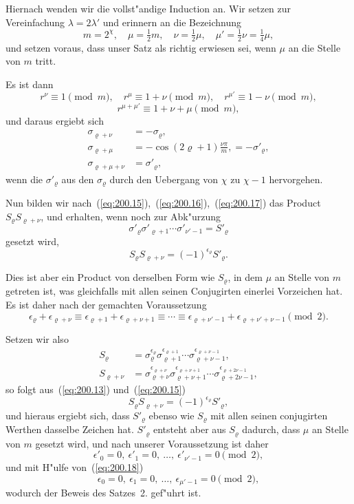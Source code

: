 \documentclass[10pt,a4paper]{article}
\theoremstyle{weberstyle}
\begin{document}
Hiernach wenden wir die vollst"andige Induction an. Wir setzen zur
Vereinfachung $\lambda=2\lambda'$ und erinnern an die Bezeichnung
\begin{equation}\label{eq:200.14}
m=2^\chi,\quad \mu=\tfrac{1}{2}m,\quad \nu=\tfrac{1}{2}\mu,\quad
\mu'=\tfrac{1}{2}\nu=\tfrac{1}{4}\mu,
\end{equation}
und setzen voraus, dass unser Satz als richtig erwiesen sei, wenn $\mu$ an
die Stelle von $m$ tritt.

Es ist dann
\[
r^{\nu}\equiv 1\pmod{m},\quad r^{\mu}\equiv 1+\nu\pmod{m},\quad
r^{\mu'}\equiv 1-\nu\pmod{m},
\]
\[
r^{\mu+\mu'}\equiv 1+\nu+\mu\pmod{m},
\]
und daraus ergiebt sich
\begin{align}
\sigma_{\varrho+\nu} &= -\sigma_\varrho,\label{eq:200.15}\\
\sigma_{\varrho+\mu} &= -\cos(2\varrho+1)\frac{\nu\pi}{m},
= -\sigma'_\varrho,\label{eq:200.16}\\
\sigma_{\varrho+\mu+\nu} &= \sigma'_\varrho,\label{eq:200.17}
\end{align}
wenn die $\sigma'_\varrho$ aus den $\sigma_\varrho$ durch den Uebergang von $\chi$
zu $\chi-1$ hervorgehen.

Nun bilden wir nach~(\ref{eq:200.15}),~(\ref{eq:200.16}),~(\ref{eq:200.17})
das Product $S_\varrho S_{\varrho+\nu}$, und erhalten, wenn noch zur Abk"urzung
\[
\sigma'_\varrho\sigma'_{\varrho+1}\cdots\sigma'_{\nu'-1} = S'_\varrho
\]
gesetzt wird,
\[
S_\varrho S_{\varrho+\nu} = (-1)^{\epsilon_\varrho} S'_{\varrho}.
\]

Dies ist aber ein Product von derselben Form wie $S_\varrho$, in dem $\mu$
an Stelle von $m$ getreten ist, was gleichfalls mit allen seinen
Conjugirten einerlei Vorzeichen hat. Es ist daher nach der gemachten
Voraussetzung
\begin{equation}\label{eq:200.18}
\epsilon_\varrho + \epsilon_{\varrho+\nu} \equiv \epsilon_{\varrho+1} +
\epsilon_{\varrho+\nu+1} \equiv \cdots \equiv \epsilon_{\varrho+\nu'-1} +
\epsilon_{\varrho+\nu'+\nu-1}\pmod{2}.
\end{equation}

Setzen wir also
\begin{align*}
S_\varrho &= \sigma_\varrho^{\epsilon_\varrho}\sigma_{\varrho+1}^{\epsilon_{\varrho+1}}
\cdots\sigma_{\varrho+\nu-1}^{\epsilon_{\varrho+\nu-1}},\\
S_{\varrho+\nu} &= \sigma_{\varrho+\nu}^{\epsilon_{\varrho+\nu}}
\sigma_{\varrho+\nu+1}^{\epsilon_{\varrho+\nu+1}}
\cdots\sigma_{\varrho+2\nu-1}^{\epsilon_{\varrho+2\nu-1}},
\end{align*}
so folgt aus~(\ref{eq:200.13}) und~(\ref{eq:200.15})
\[
S_\varrho S_{\varrho+\nu} = (-1)^{\epsilon_\varrho} S'_{\varrho},
\]
und hieraus ergiebt sich, dass $S'_\varrho$ ebenso wie $S_\varrho$ mit allen
seinen conjugirten Werthen dasselbe Zeichen hat. $S'_\varrho$ entsteht aber
aus $S_\varrho$ dadurch, dass $\mu$ an Stelle von $m$ gesetzt wird, und nach
unserer Voraussetzung ist daher
\[
\epsilon'_0=0,\ \epsilon'_1=0,\ \dots,\ \epsilon'_{\nu'-1}=0\pmod{2},
\]
und mit H"ulfe von~(\ref{eq:200.18})
\[
\epsilon_0=0,\ \epsilon_1=0,\ \dots,\ \epsilon_{\mu'-1}=0\pmod{2},
\]
wodurch der Beweis des Satzes~2. gef"uhrt ist.
\end{document}

